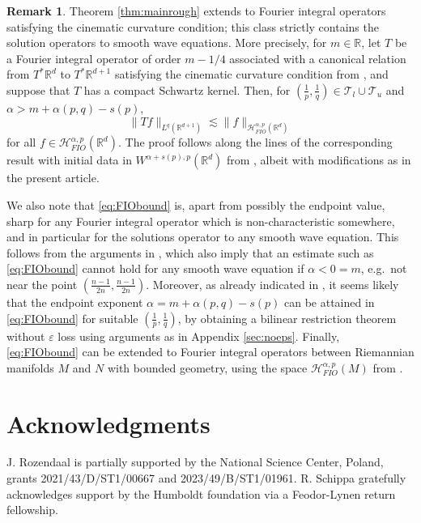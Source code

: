 \documentclass{amsart}
\numberwithin{equation}{section}
\theoremstyle{definition}
\newtheorem{remark}[theorem]{Remark}
\newcommand{\R}{\mathbb{R}}
\newcommand{\Rd}{\mathbb{R}^{d}}
\newcommand{\Rn}{\mathbb{R}^{d}}
\newcommand {\HT}{\mathcal{H}}
\newcommand {\veps}{\varepsilon}
\begin{document}
\begin{remark}\label{rem:FIOestimates}
Theorem \ref{thm:mainrough} extends to Fourier integral operators satisfying the cinematic curvature condition; this class strictly contains the solution operators to smooth wave equations. More precisely, for $m\in\R$, let $T$ be a Fourier integral operator of order $m-1/4$ associated with a canonical relation from $T^{*}\Rd$ to $T^{*}\R^{d+1}$ satisfying the cinematic curvature condition from \cite{Sogge1991}, and suppose that $T$ has a compact Schwartz kernel. Then, for $(\frac{1}{p},\frac{1}{q})\in \mathcal{T}_{l}\cup\mathcal{T}_{u}$ and $\alpha>m+\alpha(p,q)-s(p)$, 
\begin{equation}\label{eq:FIObound}
\|Tf\|_{L^{q}(\R^{d+1})}\lesssim \|f\|_{\HT^{\alpha,p}_{FIO}(\Rd)}
\end{equation}
for all $f\in \HT^{\alpha,p}_{FIO}(\Rd)$. The proof follows along the lines of the corresponding result with initial data in $W^{\alpha+s(p),p}(\Rn)$ from \cite[Corollary 1.5]{Lee2006}, albeit with modifications  as in the present article.

We also note that \eqref{eq:FIObound} is, apart from possibly the endpoint value, sharp for any Fourier integral operator which is non-characteristic somewhere, and in particular for the solutions operator to any smooth wave equation. This follows from the arguments in \cite[Section 7]{LiRoSoYa24}, which also imply that an estimate such as \eqref{eq:FIObound} cannot hold for any smooth wave equation if $\alpha<0=m$, e.g.~not near the point $(\frac{n-1}{2n},\frac{n-1}{2n})$. Moreover, as already indicated in \cite{Lee2006}, it seems likely that the endpoint exponent $\alpha=m+\alpha(p,q)-s(p)$ can be attained in \eqref{eq:FIObound} for suitable $(\frac{1}{p},\frac{1}{q})$, by obtaining a bilinear restriction theorem without $\veps$ loss using arguments as in Appendix \ref{sec:noeps}. Finally, \eqref{eq:FIObound} can be extended to Fourier integral operators between Riemannian manifolds $M$ and $N$ with bounded geometry, using the space $\HT^{\alpha,p}_{FIO}(M)$ from \cite{LiRoSoYa24}.
\end{remark}

\section*{Acknowledgments}
J. Rozendaal is partially supported by the National Science Center, Poland, grants 2021/43/D/ST1/00667 and 2023/49/B/ST1/01961. R. Schippa gratefully acknowledges support by the Humboldt foundation via a Feodor-Lynen return fellowship.
\end{document}
